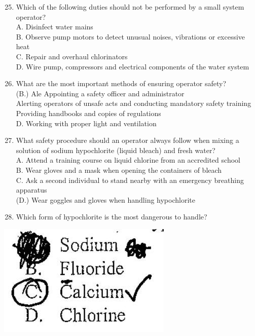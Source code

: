 \documentclass[10pt]{article}
\begin{document}
\begin{enumerate}
  \setcounter{enumi}{24}
  \item Which of the following duties should not be performed by a small system operator?\\
A. Disinfect water mains\\
B. Observe pump motors to detect unusual noises, vibrations or excessive heat\\
C. Repair and overhaul chlorinators\\
D. Wire pump, compressors and electrical components of the water system

  \item What are the most important methods of ensuring operator safety?\\
(B.) Ale Appointing a safety officer and administrator\\
Alerting operators of unsafe acts and conducting mandatory safety training Providing handbooks and copies of regulations\\
D. Working with proper light and ventilation

  \item What safety procedure should an operator always follow when mixing a solution of sodium hypochlorite (liquid bleach) and fresh water?\\
A. Attend a training course on liquid chlorine from an accredited school\\
B. Wear gloves and a mask when opening the containers of bleach\\
C. Ask a second individual to stand nearby with an emergency breathing apparatus\\
(D.) Wear goggles and gloves when handling hypochlorite

  \item Which form of hypochlorite is the most dangerous to handle?

\end{enumerate}

\includegraphics[max width=\textwidth]{2022_11_11_6852287475e47d0e3aceg-04}
\end{document}
